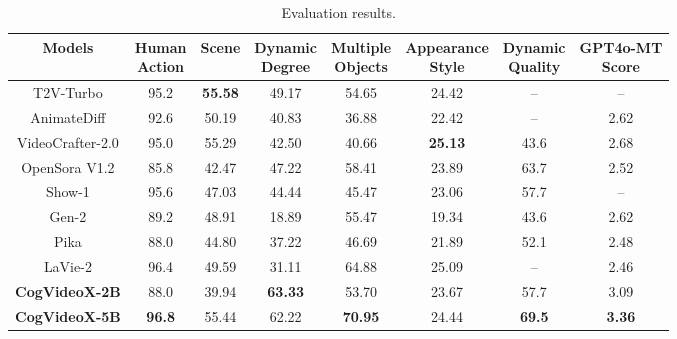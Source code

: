 
\begin{table}[t]
\caption{Evaluation results.}
\label{table:results}
\vspace{6pt}
\footnotesize
    \centering
    \begin{tabular}{cccccccc}
   \toprule
        Models & \Centerstack{Human \\Action}   & Scene & \Centerstack{Dynamic \\Degree} & \Centerstack{Multiple \\Objects} & \Centerstack{Appearance \\Style} & \Centerstack{Dynamic \\Quality} & \Centerstack{GPT4o-MT \\Score}  \\ 
        \midrule
        T2V-Turbo & 95.2 & \textbf{55.58} & 49.17 & 54.65 & 24.42 & -- & --  \\ 
        AnimateDiff & 92.6  & 50.19 & 40.83 & 36.88 & 22.42 & -- & 2.62  \\ 
        VideoCrafter-2.0 & 95.0  & 55.29 & 42.50 & 40.66 & \textbf{25.13} & 43.6 & 2.68  \\ 
        OpenSora V1.2 & 85.8  & 42.47 & 47.22 & 58.41  & 23.89 & 63.7 & 2.52  \\ 
        Show-1 & 95.6  & 47.03 & 44.44 & 45.47  & 23.06 & 57.7 & --  \\ 
        Gen-2 & 89.2  & 48.91 & 18.89 & 55.47 & 19.34 & 43.6 & 2.62  \\ 
        Pika & 88.0  & 44.80 & 37.22 & 46.69  & 21.89 & 52.1 & 2.48  \\ 
        LaVie-2 & 96.4 & 49.59 & 31.11 & 64.88  & 25.09 & -- & 2.46  \\ 
        \hline
        \textbf{CogVideoX-2B} & 88.0 & 39.94 & \textbf{63.33} & 53.70 & 23.67 & 57.7 & 3.09 \\
        \textbf{CogVideoX-5B} & \textbf{96.8} & 55.44 & 62.22 & \textbf{70.95} & 24.44 & \textbf{69.5} & \textbf{3.36} \\
        \bottomrule
    \end{tabular}
\end{table}